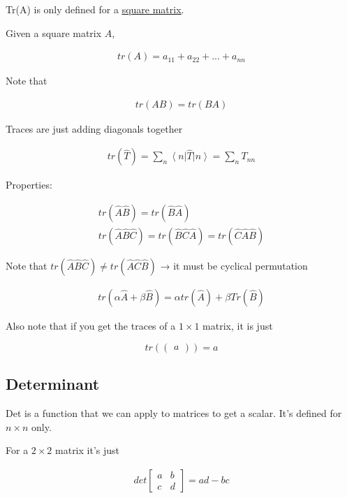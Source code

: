 \documentclass[
]{article}
\let\oldhyperref\hyperref
\renewcommand{\hyperref}[2][]{\oldhyperref[#1]{\underline{#2}}}
\providecommand{\ket}[1]{\left\lvert #1 \right\rangle}
\providecommand{\bra}[1]{\left\langle #1 \right\rvert}
\begin{document}
Tr(A) is only defined for a \hyperref[square-matrix]{square matrix}.

Given a square matrix \(A\),

\begin{gather*}
	tr(A)=a_{11}+a_{22}+...+a_{nn}
\end{gather*}

Note that

\begin{gather*}
	tr(AB)=tr(BA)
\end{gather*}

Traces are just adding diagonals together

\begin{gather*}
	tr(\hat{T})=\sum_n\bra{n}\hat{T}\ket{n}=\sum_nT_{nn}
\end{gather*}

Properties:

\begin{gather*}
	tr(\hat{A}\hat{B})=tr(\hat{B}\hat{A})\\
	tr(\hat{A}\hat{B}\hat{C})=tr(\hat{B}\hat{C}\hat{A})=tr(\hat{C}\hat{A}\hat{B})
\end{gather*}

Note that \(tr(\hat{A}\hat{B}\hat{C})\neq tr(\hat{A}\hat{C}\hat{B})\) →
it must be cyclical permutation

\begin{gather*}
	tr(\alpha\hat{A}+\beta\hat{B})=\alpha tr(\hat{A})+\beta Tr(\hat{B})
\end{gather*}

Also note that if you get the traces of a \(1\times 1\) matrix, it is just

\[
	tr(\begin{pmatrix}a\end{pmatrix})=a
\]

\subsection{Determinant}\label{determinants}

Det is a function that we can apply to matrices to get a scalar. It's
defined for \(n\times n\) only.

For a \(2\times 2\) matrix it's just

\begin{gather*}
	det\begin{bmatrix}a & b \\ c & d\end{bmatrix}=ad-bc
\end{gather*}
\end{document}
